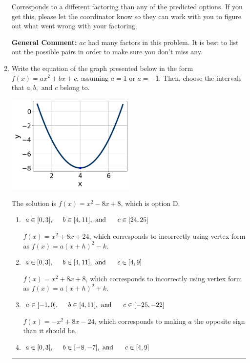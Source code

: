 \documentclass{extbook}[14pt]
\newcommand{\litem}[1]{\item #1

\rule{\textwidth}{0.4pt}}
\begin{document}
\begin{enumerate}
{\begin{enumerate}[label=\Alph*.]
 Corresponds to a different factoring than any of the predicted options. If you get this, please let the coordinator know so they can work with you to figure out what went wrong with your factoring.
\end{enumerate}

\textbf{General Comment:} $ac$ had many factors in this problem. It is best to list out the possible pairs in order to make sure you don't miss any.
}
\litem{
Write the equation of the graph presented below in the form $f(x)=ax^2+bx+c$, assuming  $a=1$ or $a=-1$. Then, choose the intervals that $a, b,$ and $c$ belong to.

\begin{center}
    \includegraphics[width=0.5\textwidth]{../Figures/quadraticGraphToEquationCopyA.png}
\end{center}




The solution is \( f(x) = x^{2} -8 x + 8 \), which is option D.\begin{enumerate}[label=\Alph*.]
\item \( a \in [0, 3], \hspace*{5mm} b \in [4, 11], \text{ and } \hspace*{5mm} c \in [24, 25] \)

$f(x)=x^{2} +8 x + 24$, which corresponds to incorrectly using vertex form as $f(x) = a(x+h)^2 - k$.
\item \( a \in [0, 3], \hspace*{5mm} b \in [4, 11], \text{ and } \hspace*{5mm} c \in [4, 9] \)

$f(x)=x^{2} +8 x + 8$, which corresponds to incorrectly using vertex form as $f(x) = a(x+h)^2+k$.
\item \( a \in [-1, 0], \hspace*{5mm} b \in [4, 11], \text{ and } \hspace*{5mm} c \in [-25, -22] \)

$f(x)=-x^{2} +8 x -24$, which corresponds to making $a$ the opposite sign than it should be.
\item \( a \in [0, 3], \hspace*{5mm} b \in [-8, -7], \text{ and } \hspace*{5mm} c \in [4, 9] \)


\end{enumerate}}
\end{enumerate}
\end{document}
